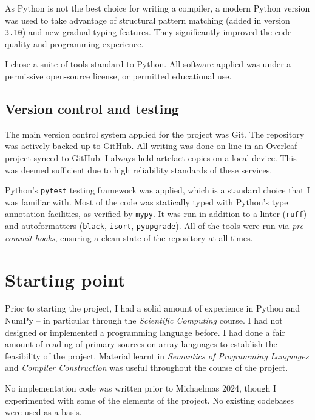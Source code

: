 As Python is not the best choice for writing a compiler, a modern Python version was used to take advantage of structural pattern matching (added in version \texttt{3.10}) and new gradual typing features. They significantly improved the code quality and programming experience. 

I chose a suite of tools standard to Python. All software applied was under a permissive open-source license, or permitted educational use.

\subsection{Version control and testing}

The main version control system applied for the project was Git. The repository was actively backed up to GitHub. All writing was done on-line in an Overleaf project synced to GitHub. I always held artefact copies on a local device. This was deemed sufficient due to high reliability standards of these services. 

Python's \texttt{pytest} testing framework was applied, which is a standard choice that I was familiar with.
Most of the code was statically typed with Python's type annotation facilities, as verified by \texttt{mypy}. It was run in addition to a linter (\texttt{ruff}) and autoformatters (\texttt{black}, \texttt{isort}, \texttt{pyupgrade}). All of the tools were run via \textit{pre-commit hooks}, ensuring a clean state of the repository at all times.



\section{Starting point}
\label{starting-point}

Prior to starting the project, I had a solid amount of experience in Python and NumPy -- in particular through the \textit{Scientific Computing} course. I had not designed or implemented a programming language before. I had done a fair amount of reading of primary sources on array languages to establish the feasibility of the project. Material learnt in \textit{Semantics of Programming Languages} and \textit{Compiler Construction} was useful throughout the course of the project.

No implementation code was written prior to Michaelmas 2024, though I experimented with some of the elements of the project. No existing codebases were used as a basis. 
